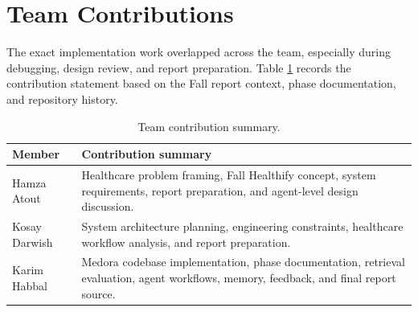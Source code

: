 \section{Team Contributions}

The exact implementation work overlapped across the team, especially during debugging, design review, and report preparation. Table \ref{tab:team_contributions} records the contribution statement based on the Fall report context, phase documentation, and repository history.

\begin{table}[htbp]
\centering
\caption{Team contribution summary.}
\label{tab:team_contributions}
\begin{tabular}{p{} p{}}
\toprule
\textbf{Member} & \textbf{Contribution summary}\\
\midrule
Hamza Atout & Healthcare problem framing, Fall Healthify concept, system requirements, report preparation, and agent-level design discussion.\\
Kosay Darwish & System architecture planning, engineering constraints, healthcare workflow analysis, and report preparation.\\
Karim Habbal & Medora codebase implementation, phase documentation, retrieval evaluation, agent workflows, memory, feedback, and final report source.\\
\bottomrule
\end{tabular}
\end{table}
